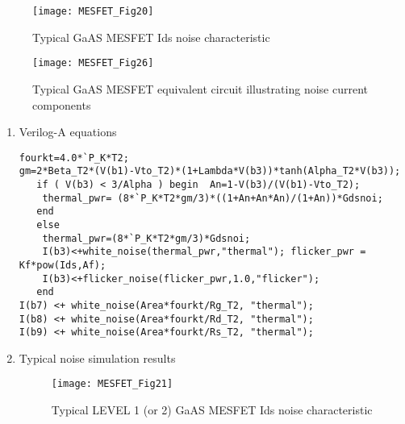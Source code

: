 \begin{figure} 
  \centering
  \texttt{[image: MESFET\_Fig20]}  
  \caption{Typical GaAS MESFET Ids noise characteristic} 
  \label{fig:fig20} 
\end{figure} 


\begin{figure} [here]
  \centering
  \texttt{[image: MESFET\_Fig26]}  
  \caption{Typical GaAS MESFET equivalent circuit illustrating noise current components} 
  \label{fig:fig26} 
\end{figure} 

\begin{enumerate}
 \item Verilog-A equations
\begin{verbatim}
fourkt=4.0*`P_K*T2;
gm=2*Beta_T2*(V(b1)-Vto_T2)*(1+Lambda*V(b3))*tanh(Alpha_T2*V(b3));
   if ( V(b3) < 3/Alpha ) begin  An=1-V(b3)/(V(b1)-Vto_T2);
    thermal_pwr= (8*`P_K*T2*gm/3)*((1+An+An*An)/(1+An))*Gdsnoi;
   end
   else
    thermal_pwr=(8*`P_K*T2*gm/3)*Gdsnoi; 
    I(b3)<+white_noise(thermal_pwr,"thermal"); flicker_pwr = Kf*pow(Ids,Af); 
    I(b3)<+flicker_noise(flicker_pwr,1.0,"flicker");
   end
I(b7) <+ white_noise(Area*fourkt/Rg_T2, "thermal");
I(b8) <+ white_noise(Area*fourkt/Rd_T2, "thermal");
I(b9) <+ white_noise(Area*fourkt/Rs_T2, "thermal");
\end{verbatim} 

\item Typical noise simulation results
\begin{figure} [here]
  \centering
  \texttt{[image: MESFET\_Fig21]}  
  \caption{Typical LEVEL 1 (or 2) GaAS MESFET Ids noise characteristic} 
  \label{fig:fig21} 
\end{figure} 

\end{enumerate}

